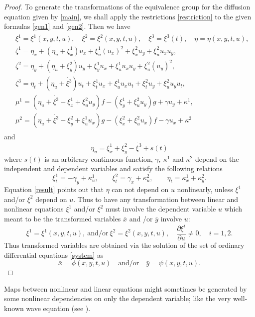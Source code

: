 \documentclass[a4paper]{article}
\def\bea{\begin{eqnarray}}
\def\eea{\end{eqnarray}}
\def\be{\begin{equation}}
\def\ee{\end{equation}}
\def\bes{\begin{equation*}}
\def\ees{\end{equation*}}
\begin{document}
\begin{proof}
To generate the transformations of the  equivalence group for the diffusion equation given by \eqref{main}, we shall apply the restrictions  \eqref{restriction}   to the given formulas  \eqref{gen1} and \eqref{gen2}.
Then we have
 \bea
 \label{generators}
\begin{split}
&\xi^1=\xi^1(x,y,t,u), \quad \xi^2=\xi^2(x,y,t,u),\quad  \xi^3=\xi^3(t),\quad \eta=\eta(x,y,t,u),\\
&\zeta^1= \eta_x+(\eta_u+\xi^1_x)u_{x}+\xi^1_u (u_x)^2+\xi^2_x u_y+\xi^2_u u_x u_y,\\
&\zeta^2= \eta_y+(\eta_u+\xi^2_y)u_y+\xi^1_y u_x+\xi^1_u u_x u_y+\xi^2_u (u_y)^2,\\
&\zeta^3= \eta_t+(\eta_u+\dot{\xi^3})u_t+\xi^1_t u_x+\xi^1_u u_x u_t+\xi^2_tu_y+\xi^2_u u_y u_t,\\
&\mu^1=(\eta_u+\dot{\xi^3}-\xi^1_x+\xi^2_uu_y)f-(\xi^1_y+\xi^2_u u_y)g+\gamma u_y+\kappa^1,\\
&\mu^2=(\eta_u+\dot{\xi^3}-\xi^2_y+\xi^1_u u_x)g-(\xi^2_x+\xi^2_u u_x)f-\gamma u_x+\kappa^2
\end{split}
\eea
and
\be
\label{result}
\eta_u=\xi^1_x+\xi^2_y-\dot{\xi^3}+s(t)\ee
 where $s(t)$ is an arbitrary continuous function, $\gamma,\ \kappa^1$ and $\kappa^2$ depend on the independent and dependent variables and  satisfy the following relations $$ \xi^1_t=-\gamma_y+\kappa^1_u,\qquad
\xi^2_t=\gamma_x+\kappa^2_u,\qquad \eta_t=\kappa^1_x+\kappa^2_y.$$
Equation  \eqref{result} points out that  $\eta$ can not depend on $u$ nonlinearly, unless $\xi^1$
and/or $\xi^2$  depend on $u$. Thus to have any transformation between linear and nonlinear equations  $\xi^1$ and/or $\xi^2$ must involve the dependent variable $u$  which meant to be the transformed variables $\bar x$ and /or $\bar y$ involve $u$:
\bes
\xi^1=\xi^1(x,y,t,u), \ {\text{and/or}} \ \xi^2=\xi^2(x,y,t,u),\quad \frac{\partial \xi^i}{\partial u}\neq 0, \quad i=1,2.
\ees
  Thus transformed variables are obtained via the solution of the set of ordinary differential equations \eqref{system} as
  \bes
   \bar x=\phi(x,y,t,u)\quad  {\text {and/or} }\quad  \bar y=\psi(x,y,t,u).
 \ees
   
\end{proof}
\par
Maps between nonlinear and linear equations might  sometimes be generated by some  nonlinear  dependencies on only the dependent variable;  like the very well-known wave equation (see \cite{torrisi2004linearization,sophocleous2008differential,
ibragimov2010quasi}).  
\end{document}
